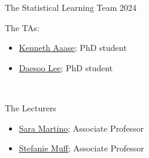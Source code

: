 \documentclass[
  10pt,
  ignorenonframetext,
]{beamer}
\providecommand{\tightlist}{%
  \setlength{\itemsep}{0pt}\setlength{\parskip}{0pt}}
\begin{document}
\begin{frame}{The Statistical Learning Team 2024}
\protect\hypertarget{the-statistical-learning-team-2024}{}
\begin{block}{The TAs:}
\protect\hypertarget{the-tas}{}
\vspace{2mm}

\begin{itemize}
\tightlist
\item
  \href{https://www.ntnu.no/ansatte/kenneth.aase}{Kenneth Aaase}; PhD
  student
\item
  \href{https://www.ntnu.no/ansatte/daesoo.lee}{Daesoo Lee}; PhD student
\end{itemize}

\(~\)
\end{block}

\begin{block}{The Lecturers}
\protect\hypertarget{the-lecturers}{}
\vspace{2mm}

\begin{itemize}
\tightlist
\item
  \href{https://www.ntnu.no/ansatte/sara.martino}{Sara Martino};
  Associate Professor
\item
  \href{https://www.ntnu.edu/employees/stefanie.muff}{Stefanie Muff};
  Associate Professor
\end{itemize}
\end{block}
\end{frame}
\end{document}
